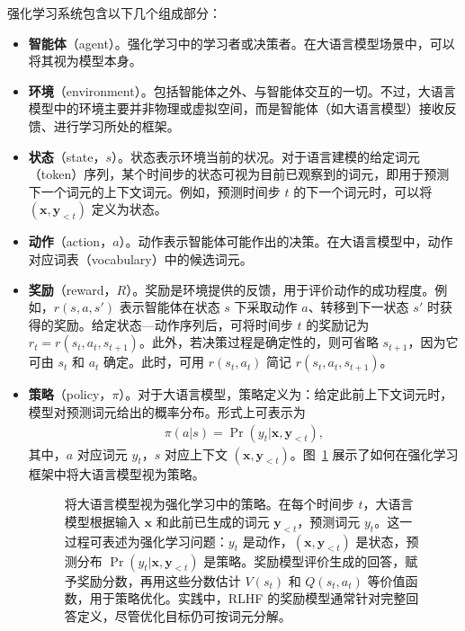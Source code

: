 强化学习系统包含以下几个组成部分：

\begin{itemize}
\item \vspace{0.5em} \textbf{智能体}（agent）。强化学习中的学习者或决策者。在大语言模型场景中，可以将其视为模型本身。
\item \vspace{0.3em} \textbf{环境}（environment）。包括智能体之外、与智能体交互的一切。不过，大语言模型中的环境主要并非物理或虚拟空间，而是智能体（如大语言模型）接收反馈、进行学习所处的框架。
\item \vspace{0.3em} \textbf{状态}（state，$s$）。状态表示环境当前的状况。对于语言建模的给定词元（token）序列，某个时间步的状态可视为目前已观察到的词元，即用于预测下一个词元的上下文词元。例如，预测时间步 $t$ 的下一个词元时，可以将 $(\mathbf{x}, \mathbf{y}_{< t})$ 定义为状态。
\item \vspace{0.3em} \textbf{动作}（action，$a$）。动作表示智能体可能作出的决策。在大语言模型中，动作对应词表（vocabulary）中的候选词元。
\item \vspace{0.3em} \textbf{奖励}（reward，$R$）。奖励是环境提供的反馈，用于评价动作的成功程度。例如，$r(s,a,s')$ 表示智能体在状态 $s$ 下采取动作 $a$、转移到下一状态 $s'$ 时获得的奖励。给定状态—动作序列后，可将时间步 $t$ 的奖励记为 $r_t = r(s_t,a_t,s_{t+1})$。此外，若决策过程是确定性的，则可省略 $s_{t+1}$，因为它可由 $s_t$ 和 $a_t$ 确定。此时，可用 $r(s_t,a_t)$ 简记 $r(s_t,a_t,s_{t+1})$。
\item \vspace{0.3em} \textbf{策略}（policy，$\pi$）。对于大语言模型，策略定义为：给定此前上下文词元时，模型对预测词元给出的概率分布。形式上可表示为
    \begin{eqnarray}
    \pi(a|s) = \Pr(y_t|\mathbf{x}, \mathbf{y}_{< t}),
    \end{eqnarray}
    其中，$a$ 对应词元 $y_t$，$s$ 对应上下文 $(\mathbf{x}, \mathbf{y}_{< t})$。图~\ref{fig:llm-as-policy-in-rl} 展示了如何在强化学习框架中将大语言模型视为策略。

\begin{figure}[!t]
\centering

\caption{将大语言模型视为强化学习中的策略。在每个时间步 $t$，大语言模型根据输入 $\mathbf{x}$ 和此前已生成的词元 $\mathbf{y}_{<t}$，预测词元 $y_t$。这一过程可表述为强化学习问题：$y_t$ 是动作，$(\mathbf{x},\mathbf{y}_{<t})$ 是状态，预测分布 $\Pr(y_t|\mathbf{x},\mathbf{y}_{<t})$ 是策略。奖励模型评价生成的回答，赋予奖励分数，再用这些分数估计 $V(s_t)$ 和 $Q(s_t,a_t)$ 等价值函数，用于策略优化。实践中，RLHF 的奖励模型通常针对完整回答定义，尽管优化目标仍可按词元分解。}
\label{fig:llm-as-policy-in-rl}
\end{figure}


\end{itemize}
